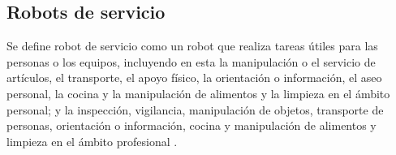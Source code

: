 \subsection{Robots de servicio}
\label{sec:robot_servicio}

Se define robot de servicio como un robot que realiza tareas útiles para las personas o los equipos, incluyendo en esta la manipulación o el servicio de artículos, el transporte, el apoyo físico, la orientación o información, el aseo personal, la cocina y la manipulación de alimentos y la limpieza en el ámbito personal; y la inspección, vigilancia, manipulación de objetos, transporte de personas, orientación o información, cocina y manipulación de alimentos y limpieza en el ámbito profesional \cite{ISO8373}.


     

